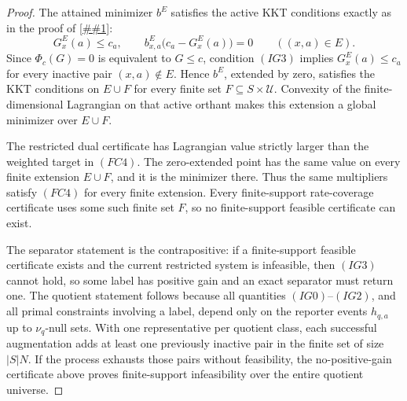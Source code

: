 \documentclass[10pt]{article}
\newcommand{\cref}[1]{\ref{##1}}
\theoremstyle{definition}
\begin{document}
\begin{proof}
   The attained minimizer \(b^E\) satisfies the active KKT conditions exactly
   as in the proof of \cref{lem:finite-rate-coverage-column-generation}:
   \[
      G_x^E(a)\le c_a,\qquad
      b^E_{x,a}\bigl(c_a-G_x^E(a)\bigr)=0
      \qquad((x,a)\in E).
      \tag{IG4}
   \]
   Since \(\Phi_c(G)=0\) is equivalent to \(G\le c\), condition \((IG3)\)
   implies \(G_x^E(a)\le c_a\) for every inactive pair
   \((x,a)\notin E\).  Hence \(b^E\), extended by zero, satisfies the KKT
   conditions on \(E\cup F\) for every finite set
   \(F\subseteq S\times\mathcal U\).  Convexity of the finite-dimensional
   Lagrangian on that active orthant makes this extension a global minimizer
   over \(E\cup F\).

   The restricted dual certificate has Lagrangian value strictly larger than
   the weighted target in \((FC4)\).  The zero-extended point has the same value
   on every finite extension \(E\cup F\), and it is the minimizer there.  Thus
   the same multipliers satisfy \((FC4)\) for every finite extension.  Every
   finite-support rate-coverage certificate uses some such finite set \(F\), so
   no finite-support feasible certificate can exist.

   The separator statement is the contrapositive: if a finite-support feasible
   certificate exists and the current restricted system is infeasible, then
   \((IG3)\) cannot hold, so some label has positive gain and an exact separator
   must return one.  The quotient statement follows because all quantities
   \((IG0)\)--\((IG2)\), and all primal constraints involving a label, depend
   only on the reporter events \(h_{q,a}\) up to \(\nu_q\)-null sets.  With one
   representative per quotient class, each successful augmentation adds at
   least one previously inactive pair in the finite set of size \(|S|N\).
   If the process exhausts those pairs without feasibility, the no-positive-gain
   certificate above proves finite-support infeasibility over the entire
   quotient universe.
\end{proof}
\end{document}
